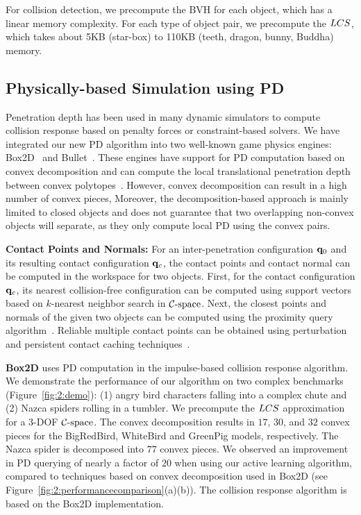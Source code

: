 For collision detection, we precompute the BVH for each object, which has a linear memory complexity. For each type of object pair, we precompute the $LCS$, which takes about 5KB (star-box) to 110KB (teeth, dragon, bunny, Buddha) memory.





\subsection{Physically-based Simulation using PD}
Penetration depth has been used in many dynamic simulators to compute collision response based on penalty forces or constraint-based solvers.
We have integrated our new PD algorithm into two well-known game physics
engines: Box2D~\cite{Erin:2012:Box2D} and Bullet~\cite{Erwin:2012:Bullet}. These engines have support for PD computation based on
convex decomposition and can compute the local translational penetration depth between convex polytopes~\cite{Gino:2001:GDC}.
However, convex decomposition can result in a high number of convex pieces, Moreover, the decomposition-based approach is mainly limited to closed
objects and does not guarantee that two
overlapping non-convex objects will separate, as they only compute local PD using the convex pairs.

\textbf{Contact Points and Normals:} For an inter-penetration configuration $\mathbf q_0$ and its resulting contact configuration $\mathbf q_c$, the contact points and contact normal can be computed in the workspace for two objects. First, for the contact configuration $\mathbf q_c$, its nearest collision-free configuration can be computed using support vectors based on $k$-nearest neighbor search in $\mathcal C\text{-space}$. Next, the closest points and normals of the given two objects can be computed using the proximity query algorithm~\cite{LGLM00}. Reliable multiple contact points can be obtained using perturbation and persistent contact caching techniques~\cite{Erwin:2012:Bullet}.

\textbf{Box2D} uses PD computation in the impulse-based collision response algorithm.
We demonstrate the performance of our algorithm on
two complex benchmarks (Figure~\ref{fig:2:demo}): (1) angry bird characters falling into a complex chute and (2) Nazca spiders rolling in a tumbler. We precompute the $LCS$ approximation for a 3-DOF $\mathcal C\text{-space}$.
The convex decomposition results in $17$, $30$, and $32$ convex pieces for the BigRedBird, WhiteBird and GreenPig models, respectively. The Nazca spider is decomposed into $77$ convex pieces. We observed an improvement in PD querying of nearly a factor of $20$ when using our active learning algorithm, compared to
techniques based on convex decomposition used in Box2D (see Figure~\ref{fig:2:performancecomparison}(a)(b)). The collision response algorithm is based on the Box2D implementation.

